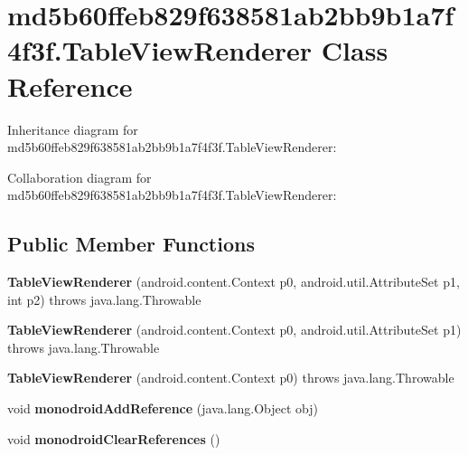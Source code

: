 \hypertarget{classmd5b60ffeb829f638581ab2bb9b1a7f4f3f_1_1_table_view_renderer}{}\section{md5b60ffeb829f638581ab2bb9b1a7f4f3f.\+Table\+View\+Renderer Class Reference}
\label{classmd5b60ffeb829f638581ab2bb9b1a7f4f3f_1_1_table_view_renderer}


Inheritance diagram for md5b60ffeb829f638581ab2bb9b1a7f4f3f.\+Table\+View\+Renderer\+:


Collaboration diagram for md5b60ffeb829f638581ab2bb9b1a7f4f3f.\+Table\+View\+Renderer\+:
\subsection*{Public Member Functions}
\begin{DoxyCompactItemize}
\item 
\mbox{\label{classmd5b60ffeb829f638581ab2bb9b1a7f4f3f_1_1_table_view_renderer_a68af3619c35003818e23669dc9cef59c}} 
{\bfseries Table\+View\+Renderer} (android.\+content.\+Context p0, android.\+util.\+Attribute\+Set p1, int p2)  throws java.\+lang.\+Throwable 	
\item 
\mbox{\label{classmd5b60ffeb829f638581ab2bb9b1a7f4f3f_1_1_table_view_renderer_a993ff43e62fb704b89294265d31986e0}} 
{\bfseries Table\+View\+Renderer} (android.\+content.\+Context p0, android.\+util.\+Attribute\+Set p1)  throws java.\+lang.\+Throwable 	
\item 
\mbox{\label{classmd5b60ffeb829f638581ab2bb9b1a7f4f3f_1_1_table_view_renderer_a74f51d5fe59d370780fb4fd9ad0475db}} 
{\bfseries Table\+View\+Renderer} (android.\+content.\+Context p0)  throws java.\+lang.\+Throwable 	
\item 
\mbox{\label{classmd5b60ffeb829f638581ab2bb9b1a7f4f3f_1_1_table_view_renderer_af259e91ecf2a98fa15f6cfa21ba30c72}} 
void {\bfseries monodroid\+Add\+Reference} (java.\+lang.\+Object obj)
\item 
\mbox{\label{classmd5b60ffeb829f638581ab2bb9b1a7f4f3f_1_1_table_view_renderer_a79caaf19be816b7fff9c8bc03b0cc805}} 
void {\bfseries monodroid\+Clear\+References} ()
\end{DoxyCompactItemize}
